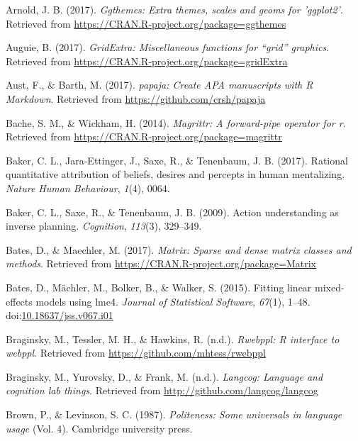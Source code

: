 \documentclass[floatsintext,man]{apa6}
\theoremstyle{definition}
\theoremstyle{definition}
\theoremstyle{definition}
\theoremstyle{remark}
\begin{document}
\setlength{\parindent}{-0.5in} \setlength{\leftskip}{0.5in}

\hypertarget{refs}{}
\hypertarget{ref-R-ggthemes}{}
Arnold, J. B. (2017). \emph{Ggthemes: Extra themes, scales and geoms for
'ggplot2'}. Retrieved from
\url{https://CRAN.R-project.org/package=ggthemes}

\hypertarget{ref-R-gridExtra}{}
Auguie, B. (2017). \emph{GridExtra: Miscellaneous functions for ``grid''
graphics}. Retrieved from
\url{https://CRAN.R-project.org/package=gridExtra}

\hypertarget{ref-R-papaja}{}
Aust, F., \& Barth, M. (2017). \emph{papaja: Create APA manuscripts with
R Markdown}. Retrieved from \url{https://github.com/crsh/papaja}

\hypertarget{ref-R-magrittr}{}
Bache, S. M., \& Wickham, H. (2014). \emph{Magrittr: A forward-pipe
operator for r}. Retrieved from
\url{https://CRAN.R-project.org/package=magrittr}

\hypertarget{ref-baker2017rational}{}
Baker, C. L., Jara-Ettinger, J., Saxe, R., \& Tenenbaum, J. B. (2017).
Rational quantitative attribution of beliefs, desires and percepts in
human mentalizing. \emph{Nature Human Behaviour}, \emph{1}(4), 0064.

\hypertarget{ref-baker2009action}{}
Baker, C. L., Saxe, R., \& Tenenbaum, J. B. (2009). Action understanding
as inverse planning. \emph{Cognition}, \emph{113}(3), 329--349.

\hypertarget{ref-R-Matrix}{}
Bates, D., \& Maechler, M. (2017). \emph{Matrix: Sparse and dense matrix
classes and methods}. Retrieved from
\url{https://CRAN.R-project.org/package=Matrix}

\hypertarget{ref-R-lme4}{}
Bates, D., Mächler, M., Bolker, B., \& Walker, S. (2015). Fitting linear
mixed-effects models using lme4. \emph{Journal of Statistical Software},
\emph{67}(1), 1--48.
doi:\href{https://doi.org/10.18637/jss.v067.i01}{10.18637/jss.v067.i01}

\hypertarget{ref-R-rwebppl}{}
Braginsky, M., Tessler, M. H., \& Hawkins, R. (n.d.). \emph{Rwebppl: R
interface to webppl}. Retrieved from
\url{https://github.com/mhtess/rwebppl}

\hypertarget{ref-R-langcog}{}
Braginsky, M., Yurovsky, D., \& Frank, M. (n.d.). \emph{Langcog:
Language and cognition lab things}. Retrieved from
\url{http://github.com/langcog/langcog}

\hypertarget{ref-brown1987}{}
Brown, P., \& Levinson, S. C. (1987). \emph{Politeness: Some universals
in language usage} (Vol. 4). Cambridge university press.
\end{document}
